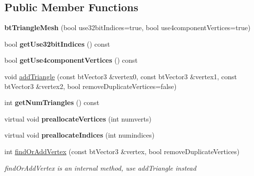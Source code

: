\subsection*{Public Member Functions}
\begin{DoxyCompactItemize}
\item 
\mbox{\label{classbtTriangleMesh_a686eefc0978d30da88bdc43c6d75589f}} 
{\bfseries bt\+Triangle\+Mesh} (bool use32bit\+Indices=true, bool use4component\+Vertices=true)
\item 
\mbox{\label{classbtTriangleMesh_af13198c9c8f5cb3f542a30ea4d5790fa}} 
bool {\bfseries get\+Use32bit\+Indices} () const
\item 
\mbox{\label{classbtTriangleMesh_abac757c144236dcc133cb27dd9d9f5bf}} 
bool {\bfseries get\+Use4component\+Vertices} () const
\item 
void \hyperlink{classbtTriangleMesh_a28551d57ae59248a210163a504558583}{add\+Triangle} (const bt\+Vector3 \&vertex0, const bt\+Vector3 \&vertex1, const bt\+Vector3 \&vertex2, bool remove\+Duplicate\+Vertices=false)
\item 
\mbox{\label{classbtTriangleMesh_a2e6b51f9d56b3b5f1aca4f4ee11f6c1c}} 
int {\bfseries get\+Num\+Triangles} () const
\item 
\mbox{\label{classbtTriangleMesh_a8c1ca8fdf198eee1812e3efe9e0098b5}} 
virtual void {\bfseries preallocate\+Vertices} (int numverts)
\item 
\mbox{\label{classbtTriangleMesh_a0b2aee6bf89eecbf2a2b955253e62b7d}} 
virtual void {\bfseries preallocate\+Indices} (int numindices)
\item 
int \hyperlink{classbtTriangleMesh_a3b521a1faa5862a818d9f983230749a2}{find\+Or\+Add\+Vertex} (const bt\+Vector3 \&vertex, bool remove\+Duplicate\+Vertices)
\begin{DoxyCompactList}\small\item\em find\+Or\+Add\+Vertex is an internal method, use add\+Triangle instead \end{DoxyCompactList}\item 
\mbox{\label{classbtTriangleMesh_aceefc2d4c6a9abaff3bd58310533fd8a}} 

\end{DoxyCompactItemize}
